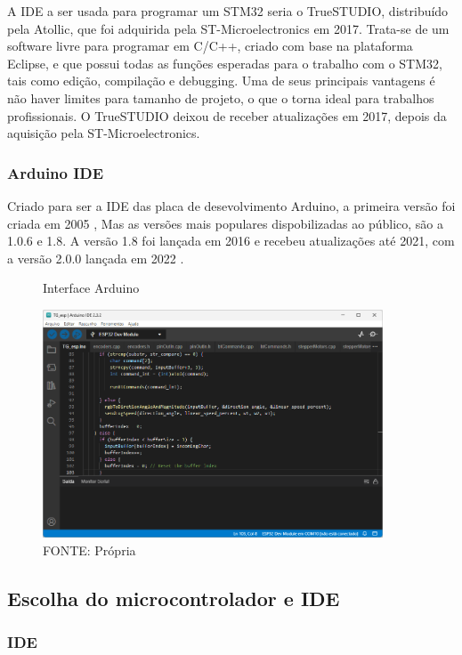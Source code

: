 A IDE a ser usada para programar um STM32 seria o TrueSTUDIO, distribuído pela
Atollic, que foi adquirida pela ST-Microelectronics em 2017. Trata-se de um
software livre para programar em C/C++, criado com base na plataforma Eclipse,
e que possui todas as funções esperadas para o trabalho com o STM32, tais como
edição, compilação e debugging. Uma de seus principais vantagens é não haver
limites para tamanho de projeto, o que o torna ideal para trabalhos
profissionais. O TrueSTUDIO deixou de receber atualizações em 2017,
depois da aquisição pela ST-Microelectronics.\cite{apostila_microprossados}


\subsubsection{Arduino IDE}

Criado para ser a IDE das placa de desevolvimento Arduino, a primeira versão foi criada em 2005 \cite{arduino_id_history},
Mas as versões mais populares dispobilizadas ao público, são a 1.0.6 e 1.8. 
A versão 1.8 foi lançada em 2016 e recebeu atualizações até 2021, 
com a versão 2.0.0 lançada em 2022 \cite{arduino_tag_2}.

\begin{figure}[ht]
	\centering
	\caption{Interface Arduino}
	\includegraphics[width=0.9\textwidth]{figures/arduino}
	\caption*{FONTE: Própria}
\end{figure}

\subsection{Escolha do microcontrolador e IDE}

\subsubsection{IDE}

